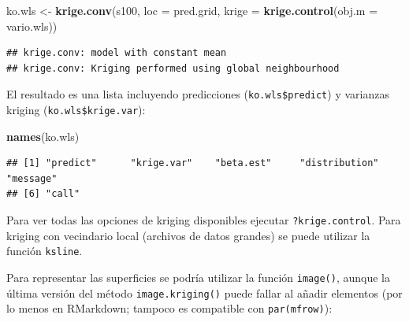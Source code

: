 \documentclass[
]{book}
\newenvironment{Shaded}{\begin{snugshade}}{\end{snugshade}}
\newcommand{\AttributeTok}[1]{\textcolor[rgb]{0.13,0.29,0.53}{#1}}
\newcommand{\CommentTok}[1]{\textcolor[rgb]{0.56,0.35,0.01}{\textit{#1}}}
\newcommand{\ConstantTok}[1]{\textcolor[rgb]{0.56,0.35,0.01}{#1}}
\newcommand{\FunctionTok}[1]{\textcolor[rgb]{0.13,0.29,0.53}{\textbf{#1}}}
\newcommand{\NormalTok}[1]{#1}
\newcommand{\OtherTok}[1]{\textcolor[rgb]{0.56,0.35,0.01}{#1}}
\newcommand{\SpecialCharTok}[1]{\textcolor[rgb]{0.81,0.36,0.00}{\textbf{#1}}}
\newcommand{\StringTok}[1]{\textcolor[rgb]{0.31,0.60,0.02}{#1}}
\theoremstyle{break}
\theoremstyle{definition}
\theoremstyle{definition}
\theoremstyle{definition}
\theoremstyle{definition}
\theoremstyle{remark}
\begin{document}
\begin{Shaded}
\begin{Highlighting}[]
\NormalTok{ko.wls }\OtherTok{\textless{}{-}} \FunctionTok{krige.conv}\NormalTok{(s100, }\AttributeTok{loc =}\NormalTok{ pred.grid, }\AttributeTok{krige =} \FunctionTok{krige.control}\NormalTok{(}\AttributeTok{obj.m =}\NormalTok{ vario.wls))}
\end{Highlighting}
\end{Shaded}

\begin{verbatim}
## krige.conv: model with constant mean
## krige.conv: Kriging performed using global neighbourhood
\end{verbatim}

El resultado es una lista incluyendo predicciones (\texttt{ko.wls\$predict}) y
varianzas kriging (\texttt{ko.wls\$krige.var}):

\begin{Shaded}
\begin{Highlighting}[]
\FunctionTok{names}\NormalTok{(ko.wls)}
\end{Highlighting}
\end{Shaded}

\begin{verbatim}
## [1] "predict"      "krige.var"    "beta.est"     "distribution" "message"     
## [6] "call"
\end{verbatim}

Para ver todas las opciones de kriging disponibles ejecutar
\texttt{?krige.control}. Para kriging con vecindario local (archivos de datos
grandes) se puede utilizar la función \texttt{ksline}.

Para representar las superficies se podría utilizar la función \texttt{image()},
aunque la última versión del método \texttt{image.kriging()} puede fallar al añadir
elementos (por lo menos en RMarkdown; tampoco es compatible con \texttt{par(mfrow)}):

\begin{Shaded}
\end{Shaded}
\end{document}
